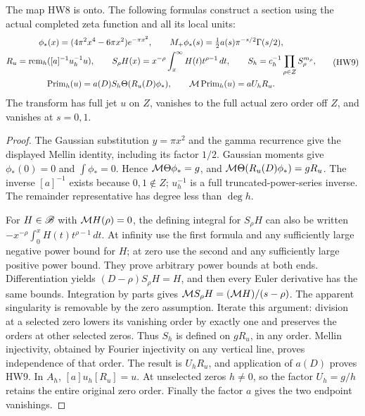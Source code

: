 \begin{lemma}\label{hw:sectionlemma}
The map HW8 is onto. The following formulas construct a section
using the actual completed zeta function and all its local units:
\[
 \begin{gathered}
 \phi_*(x)=(4\pi^2x^4-6\pi x^2)e^{-\pi x^2},\qquad
 M_+\phi_*(s)=\tfrac12a(s)\pi^{-s/2}\Gamma(s/2),\\
 R_u=\operatorname{rem}_h([a]^{-1}u_h^{-1}u),\qquad
 S_\rho H(x)=x^{-\rho}\int_x^\infty H(t)t^{\rho-1}\,dt,\qquad
 S_h=c_h^{-1}\prod_{\rho\in Z}S_\rho^{m_\rho},\\
 \operatorname{Prim}_h(u)
       =a(D)S_h\Theta(R_u(D)\phi_*),\qquad
 \mathcal M\operatorname{Prim}_h(u)=aU_hR_u.
 \end{gathered}
 \tag{HW9}\label{hw:primitive}
\]
The transform has full jet \(u\) on \(Z\), vanishes to the full
actual zero order off \(Z\), and vanishes at \(s=0,1\).
\end{lemma}
\begin{proof}
The Gaussian substitution \(y=\pi x^2\) and the gamma recurrence
give the displayed Mellin identity, including its factor \(1/2\).
Gaussian moments give \(\phi_*(0)=0\) and \(\int\phi_*=0\).
Hence \(\mathcal M\Theta\phi_*=g\), and
\(\mathcal M\Theta(R_u(D)\phi_*)=gR_u\).
The inverse \([a]^{-1}\) exists because \(0,1\notin Z\);
\(u_h^{-1}\) is a full truncated-power-series inverse.
The remainder representative has degree less than \(\deg h\).

For \(H\in\mathscr B\) with \(\mathcal M H(\rho)=0\), the defining integral
for \(S_\rho H\) can also be written
\(-x^{-\rho}\int_0^xH(t)t^{\rho-1}\,dt\).
At infinity use the first formula and any sufficiently large
negative power bound for \(H\); at zero use the second and any
sufficiently large positive power bound. They prove arbitrary
power bounds at both ends. Differentiation yields
\((D-\rho)S_\rho H=H\), and then every Euler derivative has
the same bounds. Integration by parts gives
\(\mathcal M S_\rho H=(\mathcal M H)/(s-\rho)\).
The apparent singularity is removable by the zero assumption.
Iterate this argument: division at a selected zero lowers its
vanishing order by exactly one and preserves the orders at other
selected zeros. Thus \(S_h\) is defined on \(gR_u\), in any order.
Mellin injectivity, obtained by Fourier injectivity on any vertical
line, proves independence of that order.
The result is \(U_hR_u\), and application of \(a(D)\) proves HW9.
In \(A_h\), \([a]u_h[R_u]=u\). At unselected zeros \(h\ne0\),
so the factor \(U_h=g/h\) retains the entire original zero order.
Finally the factor \(a\) gives the two endpoint vanishings.
\end{proof}

